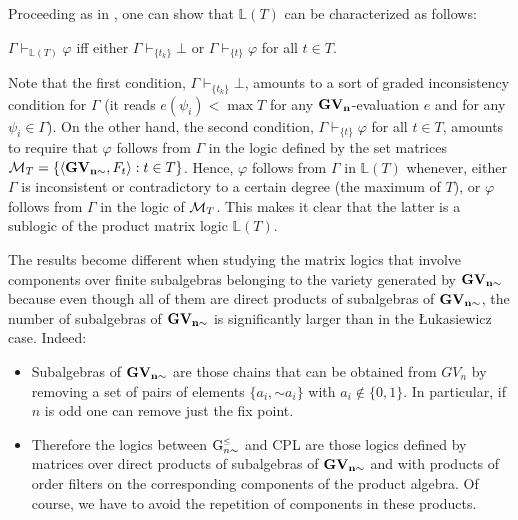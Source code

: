 \documentclass{article}
\theoremstyle{definition}
\newcommand{\ninv}{\mathord{\sim}}
\newcommand{\Gnsimleq}{\mathrm{G}\mystrut^{\text{\tiny $\leq$}}_{n\sim}}
\newcommand\mystrut{\rule{0pt}{7pt}}
\begin{document}
Proceeding as in \cite[Prop. 11]{CoEsGo}, one can show that  $\mathbb{L}(T)$ can be characterized as follows:
\begin{center}
$\Gamma \vdash_{\mathbb{L}(T)} \varphi$ iff \; either $\Gamma \vdash_{\{t_k\}} \bot $ \; or $\Gamma \vdash_{\{t\}} \varphi$ for all $t \in T$.
\end{center}
Note that the first condition, $\Gamma \vdash_{\{t_k\}} \bot$, amounts to a sort of graded inconsistency condition for $\Gamma$ (it reads $e(\psi_i) < \max T$ for any $\bf GV_n$-evaluation $e$ and for any $\psi_i \in \Gamma$). On the other hand, the second condition, $\Gamma \vdash_{\{t\}} \varphi$ for all $t \in T$, amounts to require that $\varphi$ follows from $\Gamma$ in the logic defined by the set matrices ${\cal M}_T = \{\langle {\bf GV_{n\sim}},F_t \rangle : t \in T\}$. Hence, $\varphi$ follows from $\Gamma$ in $\mathbb{L}(T)$ whenever, either $\Gamma$ is inconsistent or contradictory to a certain degree (the maximum of $T$), or $\varphi$ follows from $\Gamma$ in the logic of ${\cal M}_T$. This makes it clear that the latter is a sublogic of the product matrix logic $\mathbb{L}(T)$.

The results become different when studying the matrix logics that involve components over finite subalgebras belonging to the variety generated by $\bf GV_{n \sim}$ because even though all of them are direct products of subalgebras of $\bf GV_{n \sim}$, the number of subalgebras of $\bf GV_{n \sim}$ is significantly larger than in the {\L}ukasiewicz case. Indeed:
 \begin{itemize}
 \item Subalgebras of $\bf GV_{n \sim}$ are those chains that can be obtained from $GV_n$ by removing
 a set of pairs of elements $\{a_i, \ninv a_i\}$ with $a_i \notin \{0,1\}$. In particular, if $n$ is odd one can remove just the fix point.
 \item Therefore the logics between $\Gnsimleq$ and CPL are those logics defined by matrices over direct products of subalgebras of $\bf GV_{n \sim}$ and with products of order filters on the corresponding components of the product algebra. Of course, we have to avoid the repetition of components in these products.
 \end{itemize}
\end{document}

